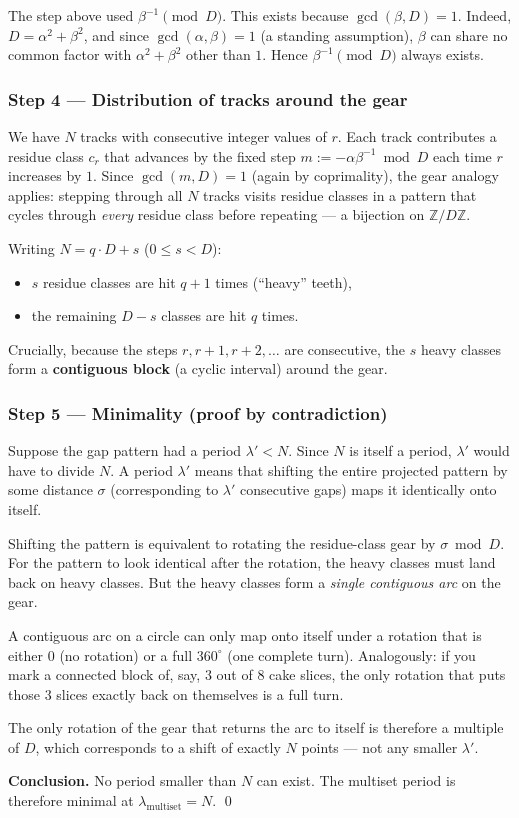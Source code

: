 \documentclass{amsart}
\theoremstyle{definition}
\theoremstyle{plain}
\theoremstyle{remark}
\begin{document}
The step above used \(\beta^{-1}\pmod{D}\).  This exists because
\(\gcd(\beta,D)=1\).  Indeed, \(D=\alpha^2+\beta^2\), and since
\(\gcd(\alpha,\beta)=1\) (a standing assumption), \(\beta\) can share no common
factor with \(\alpha^2+\beta^2\) other than \(1\).  Hence \(\beta^{-1}\pmod{D}\)
always exists.

\subsubsection*{Step 4 --- Distribution of tracks around the gear}

We have \(N\) tracks with consecutive integer values of \(r\).  Each track
contributes a residue class \(c_r\) that advances by the fixed step
\(m:=-\alpha\beta^{-1}\bmod D\) each time \(r\) increases by \(1\).  Since
\(\gcd(m,D)=1\) (again by coprimality), the gear analogy applies: stepping
through all \(N\) tracks visits residue classes in a pattern that cycles through
\emph{every} residue class before repeating --- a bijection on
\(\mathbb{Z}/D\mathbb{Z}\).

Writing \(N = q\cdot D + s\) (\(0 \le s < D\)):
\begin{itemize}
  \item \(s\) residue classes are hit \(q+1\) times (``heavy'' teeth),
  \item the remaining \(D-s\) classes are hit \(q\) times.
\end{itemize}
Crucially, because the steps \(r, r+1, r+2,\dots\) are consecutive, the
\(s\) heavy classes form a \textbf{contiguous block} (a cyclic interval) around
the gear.

\subsubsection*{Step 5 --- Minimality (proof by contradiction)}

Suppose the gap pattern had a period \(\lambda' < N\).  Since \(N\) is itself a
period, \(\lambda'\) would have to divide \(N\).  A period \(\lambda'\) means
that shifting the entire projected pattern by some distance \(\sigma\)
(corresponding to \(\lambda'\) consecutive gaps) maps it identically onto itself.

Shifting the pattern is equivalent to rotating the residue-class gear by
\(\sigma \bmod D\).  For the pattern to look identical after the rotation, the
heavy classes must land back on heavy classes.  But the heavy classes form a
\emph{single contiguous arc} on the gear.

A contiguous arc on a circle can only map onto itself under a rotation that is
either \(0\) (no rotation) or a full \(360^\circ\) (one complete turn).
Analogously: if you mark a connected block of, say, \(3\) out of \(8\) cake
slices, the only rotation that puts those \(3\) slices exactly back on
themselves is a full turn.

The only rotation of the gear that returns the arc to itself is therefore a
multiple of \(D\), which corresponds to a shift of exactly \(N\) points --- not
any smaller \(\lambda'\).

\textbf{Conclusion.}  No period smaller than \(N\) can exist.  The multiset
period is therefore minimal at \(\lambda_{\mathrm{multiset}} = N\). \qed
\end{document}
